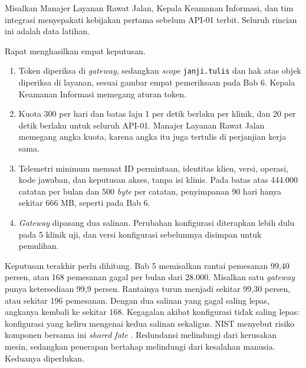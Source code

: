 \begin{kasus}[title={Kasus Medikara Health: Kebijakan Gateway untuk API-01}]
Misalkan Manajer Layanan Rawat Jalan, Kepala Keamanan Informasi, dan tim integrasi menyepakati kebijakan pertama sebelum
API-01 terbit. Seluruh rincian ini adalah data latihan.

Rapat menghasilkan empat keputusan.
\begin{enumerate}
  \item Token diperiksa di \textit{gateway}, sedangkan \textit{scope} \texttt{janji.tulis} dan hak atas objek diperiksa
        di layanan, sesuai gambar empat pemeriksaan pada Bab 6. Kepala Keamanan Informasi memegang aturan token.
  \item Kuota 300 per hari dan batas laju 1 per detik berlaku per klinik, dan 20 per detik berlaku untuk seluruh API-01.
        Manajer Layanan Rawat Jalan memegang angka kuota, karena angka itu juga tertulis di perjanjian kerja sama.
  \item Telemetri minimum memuat ID permintaan, identitas klien, versi, operasi, kode jawaban, dan keputusan akses,
        tanpa isi klinis. Pada batas atas 444.000 catatan per bulan dan 500 \textit{byte} per catatan, penyimpanan 90
        hari hanya sekitar 666 MB, seperti pada Bab 6.
  \item \textit{Gateway} dipasang dua salinan. Perubahan konfigurasi diterapkan lebih dulu pada 5 klinik uji, dan versi
        konfigurasi sebelumnya disimpan untuk pemulihan.
\end{enumerate}

Keputusan terakhir perlu dihitung. Bab 5 memisalkan rantai pemesanan 99,40 persen, atau 168 pemesanan gagal per bulan
dari 28.000. Misalkan satu \textit{gateway} punya ketersediaan 99,9 persen. Rantainya turun menjadi sekitar 99,30
persen, atau sekitar 196 pemesanan. Dengan dua salinan yang gagal saling lepas, angkanya kembali ke sekitar 168.
Kegagalan akibat konfigurasi tidak saling lepas: konfigurasi yang keliru mengenai kedua salinan sekaligus. NIST menyebut
risiko komponen bersama ini \textit{shared fate} \cite{nist-sp800-228}. Redundansi melindungi dari kerusakan mesin,
sedangkan penerapan bertahap melindungi dari kesalahan manusia. Keduanya diperlukan.
\end{kasus}

